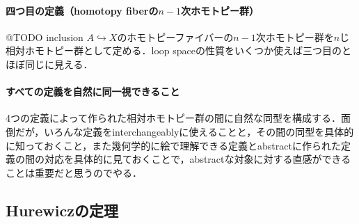\documentclass[a4paper,11pt]{jsarticle}
\theoremstyle{definition}
\begin{document}
\paragraph{四つ目の定義（homotopy fiberの$n-1$次ホモトピー群）}@TODO inclusion $A\hookrightarrow X$のホモトピーファイバーの$n-1$次ホモトピー群を$n$じ相対ホモトピー群として定める．loop spaceの性質をいくつか使えば三つ目のとほぼ同じに見える．
\paragraph{すべての定義を自然に同一視できること}4つの定義によって作られた相対ホモトピー群の間に自然な同型を構成する．面倒だが，いろんな定義をinterchangeablyに使えることと，その間の同型を具体的に知っておくこと，また幾何学的に絵で理解できる定義とabstractに作られた定義の間の対応を具体的に見ておくことで，abstractな対象に対する直感ができることは重要だと思うのでやる．
\subsection{Hurewiczの定理}
\end{document}
